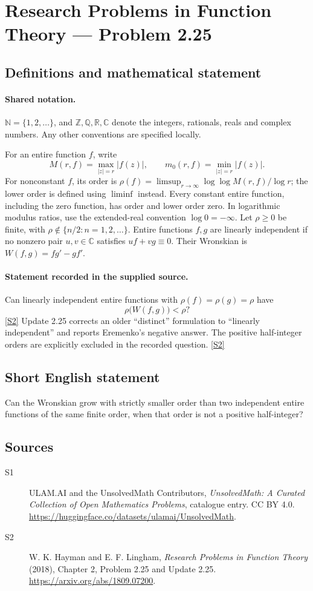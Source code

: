 \documentclass[11pt]{article}
\newcommand{\sref}[2]{\hyperlink{source:#1:#2}{[S#2]}}
\begin{document}
\section{Research Problems in Function Theory — Problem 2.25}\label{statement}

\subsection{Definitions and mathematical statement}

\paragraph{Shared notation.}$\mathbb N=\{1,2,\ldots\}$, and $\mathbb Z,\mathbb Q,\mathbb R,\mathbb C$ denote the integers, rationals, reals and complex numbers. Any other conventions are specified locally.


For an entire function $f$, write
\[
 M(r,f)=\max_{|z|=r}|f(z)|,\qquad m_0(r,f)=\min_{|z|=r}|f(z)|.
\]
For nonconstant $f$, its order is $\rho(f)=\limsup_{r\to\infty}\log\log M(r,f)/\log r$;
the lower order is defined using $\liminf$ instead. Every constant entire function, including the zero function, has order and lower order zero. In logarithmic modulus ratios, use the extended-real convention $\log0=-\infty$.
Let $\rho\ge0$ be finite, with $\rho\notin\{n/2:n=1,2,\ldots\}$. Entire functions $f,g$ are linearly independent if no nonzero pair $u,v\in\mathbb C$ satisfies $uf+vg\equiv0$. Their Wronskian is $W(f,g)=fg'-gf'$.

\paragraph{Statement recorded in the supplied source.}
Can linearly independent entire functions with $\rho(f)=\rho(g)=\rho$ have
\[\rho\bigl(W(f,g)\bigr)<\rho?\] \sref{statement}{2}
Update 2.25 corrects an older ``distinct'' formulation to ``linearly independent'' and reports Eremenko's negative answer. The positive half-integer orders are explicitly excluded in the recorded question. \sref{statement}{2}
\subsection{Short English statement}
Can the Wronskian grow with strictly smaller order than two independent entire functions of the same finite order, when that order is not a positive half-integer?
\subsection{Sources}
\begin{description}
\item[\hypertarget{source:statement:1}{S1}] ULAM.AI and the UnsolvedMath Contributors, \emph{UnsolvedMath: A Curated Collection of Open Mathematics Problems}, catalogue entry. CC BY 4.0. \url{https://huggingface.co/datasets/ulamai/UnsolvedMath}.
\item[\hypertarget{source:statement:2}{S2}] W. K. Hayman and E. F. Lingham, \emph{Research Problems in Function Theory} (2018), Chapter 2, Problem 2.25 and Update 2.25. \url{https://arxiv.org/abs/1809.07200}.
\end{description}
\label{end:statement}
\end{document}
